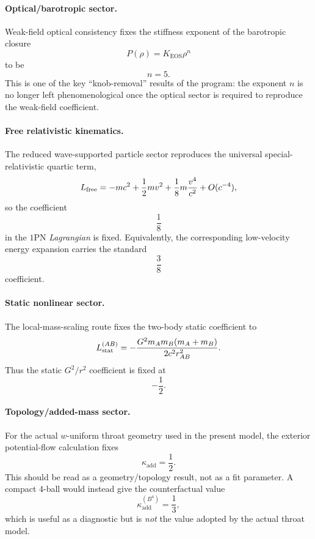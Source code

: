 \documentclass[11pt]{article}
\newcommand{\kadd}{\kappa_{\mathrm{add}}}
\newcommand{\KEOS}{K_{\mathrm{EOS}}}
\begin{document}
\paragraph{Optical/barotropic sector.}
Weak-field optical consistency fixes the stiffness exponent of the barotropic closure
\begin{equation}
P(\rho)=\KEOS \rho^n
\end{equation}
to be
\begin{equation}
n=5.
\label{eq:fixed-n}
\end{equation}
This is one of the key ``knob-removal'' results of the program: the exponent \(n\) is no
longer left phenomenological once the optical sector is required to reproduce the weak-field
coefficient.

\paragraph{Free relativistic kinematics.}
The reduced wave-supported particle sector reproduces the universal special-relativistic
quartic term,
\begin{equation}
L_{\rm free}
=
- mc^2+\frac12 mv^2+\frac18 m\frac{v^4}{c^2}+O(c^{-4}),
\label{eq:fixed-free-quartic}
\end{equation}
so the coefficient
\begin{equation}
\frac18
\end{equation}
in the \(1\)PN \emph{Lagrangian} is fixed. Equivalently, the corresponding low-velocity
energy expansion carries the standard
\begin{equation}
\frac38
\end{equation}
coefficient.

\paragraph{Static nonlinear sector.}
The local-mass-scaling route fixes the two-body static coefficient to
\begin{equation}
L_{\rm stat}^{(AB)}
=
-\frac{G^2m_A m_B(m_A+m_B)}{2c^2 r_{AB}^2}.
\label{eq:fixed-static-term}
\end{equation}
Thus the static \(G^2/r^2\) coefficient is fixed at
\begin{equation}
-\frac12.
\end{equation}

\paragraph{Topology/added-mass sector.}
For the actual \(w\)-uniform throat geometry used in the present model, the exterior
potential-flow calculation fixes
\begin{equation}
\kadd=\frac12.
\label{eq:fixed-kadd}
\end{equation}
This should be read as a geometry/topology result, not as a fit parameter. A compact
\(4\)-ball would instead give the counterfactual value
\begin{equation}
\kadd^{(B^4)}=\frac13,
\label{eq:counterfactual-bubble-kadd}
\end{equation}
which is useful as a diagnostic but is \emph{not} the value adopted by the actual throat
model.
\end{document}
